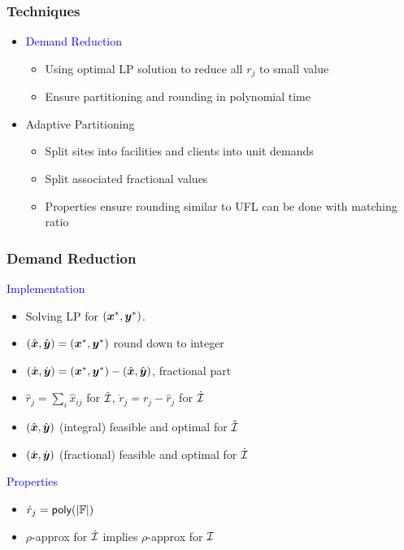 \documentclass[handout, hyperref, dvipsnames]{beamer}
\begin{document}
\begin{frame}

  \frametitle{Techniques}
  \begin{itemize}\addtolength{\itemsep}{2\baselineskip}

  \item \alert{\Large \textcolor{blue}{Demand Reduction}}
    \vspace{.1in}
    \begin{itemize}\addtolength{\itemsep}{1\baselineskip}
    \item \alert {\large Using optimal LP solution to reduce all $r_j$ to small value}
    \item \alert {\large Ensure partitioning and rounding in polynomial time}
    \end{itemize}
    
  \item {\Large {Adaptive Partitioning}}
    \vspace{.1in}
    \begin{itemize}\addtolength{\itemsep}{1\baselineskip}
    \item {\large Split sites into facilities and clients into unit demands}
    \item {\large Split associated fractional values}
    \item {\large Properties ensure rounding similar to UFL can be done with matching ratio}
    \end{itemize}
  \end{itemize}
\end{frame}

\begin{frame}
  \frametitle{Demand Reduction}

  \large{\textcolor{blue}{Implementation}}

  \begin{itemize}
  \item Solving LP for $(\boldsymbol{x}^\ast, \boldsymbol{y}^\ast)$.
  \item $(\hat{\boldsymbol{x}}, \hat{\boldsymbol{y}}) = (\boldsymbol{x}^\ast, \boldsymbol{y}^\ast)$ round down to integer
  \item $(\dot{\boldsymbol{x}}, \dot{\boldsymbol{y}}) = (\boldsymbol{x}^\ast, \boldsymbol{y}^\ast) - (\hat{\boldsymbol{x}}, \hat{\boldsymbol{y}})$, fractional part
  \item $\hat r_j = \sum_{i}\hat x_{ij}$ for $\hat{\mathcal{I}}$, $\dot r_j = r_j - \hat r_j$ for $\dot{\mathcal{I}}$
  \item $(\hat{\boldsymbol{x}}, \hat{\boldsymbol{y}})$ (integral) feasible and optimal for $\hat{\mathcal{I}}$
  \item $(\dot{\boldsymbol{x}}, \dot{\boldsymbol{y}})$ (fractional) feasible and optimal for $\dot{\mathcal{I}}$
  \end{itemize}
  
  \large{\textcolor{blue}{Properties}}

  \begin{itemize}
  \item ${\dot r}_j = {\mbox{\sf poly}}(|\mathbb{F}|)$
  \item $\rho$-approx for $\dot {\mathcal{I}}$ implies $\rho$-approx for $\mathcal{I}$
  \end{itemize}
\end{frame}
\end{document}

